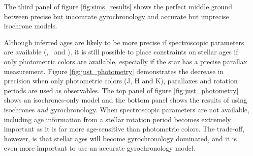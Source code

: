 The third panel of figure \ref{fig:sims_results} shows the perfect middle
ground between precise but inaccurate gyrochronology and accurate but
imprecise isochrone models.

Although inferred ages are likely to be more precise if spectroscopic
parameters are available (\teff, \logg\ and \feh), it is still possible to
place constraints on stellar ages if only photometric colors are available,
especially if the star has a precise parallax measurement.
Figure \ref{fig:just_photometry} demonstrates the decrease in precision when
only photometric colors (J, H and K), parallaxes and rotation periods are
used as observables.
The top panel of figure \ref{fig:just_photometry} shows an isochrones-only
model and the bottom panel shows the results of using isochrones {\it and}
gyrochronology.
When spectroscopic parameters are not available, including age information
from a stellar rotation period becomes extremely important as it is far more
age-sensitive than photometric colors.
The trade-off, however, is that stellar ages will become gyrochronology
dominated, and it is even more important to use an accurate gyrochronology
model.

